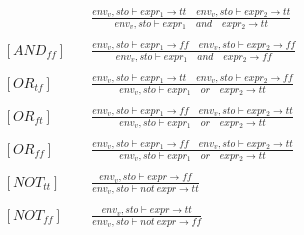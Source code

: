 \begin{align*}
    [AND_{tt}] \quad   &
    \frac
    {env_v, sto \vdash expr_1 \to tt \quad env_v, sto \vdash expr_2 \to tt}
    {env_v, sto \vdash expr_1 \quad and \quad expr_2 \to tt}
    \\
    \\
    [AND_{ff}] \quad   &
    \frac
    {env_v, sto \vdash expr_1 \to ff \quad env_v, sto \vdash expr_2 \to ff}
    {env_v, sto \vdash expr_1 \quad and \quad expr_2 \to ff}
    \\
    \\
    [OR_{tf}] \quad   &
    \frac
    {env_v, sto \vdash expr_1 \to tt \quad env_v, sto \vdash expr_2 \to ff}
    {env_v, sto \vdash expr_1 \quad or \quad expr_2 \to tt}
    \\
    \\
    [OR_{ft}] \quad   &
    \frac
    {env_v, sto \vdash expr_1 \to ff \quad env_v, sto \vdash expr_2 \to tt}
    {env_v, sto \vdash expr_1 \quad or \quad expr_2 \to tt}
    \\
    \\
    [OR_{ff}] \quad   &
    \frac
    {env_v, sto \vdash expr_1 \to ff \quad env_v, sto \vdash expr_2 \to tt}
    {env_v, sto \vdash expr_1 \quad or \quad expr_2 \to tt}
    \\
    \\
    [NOT_{tt}] \quad  &
    \frac
    {env_v, sto \vdash expr \to ff}
    {env_v, sto \vdash not \ expr \to tt}
    \\
    \\
    [NOT_{ff}] \quad  &
    \frac
    {env_v, sto \vdash expr \to tt}
    {env_v, sto \vdash not \ expr \to ff}
    \\
    \\
\end{align*}

